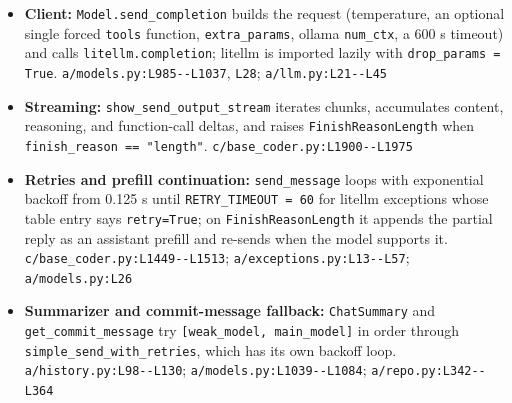 \begin{itemize}
\item \textbf{Client:} \texttt{Model.\allowbreak{}send\_\allowbreak{}completion} builds the request (temperature, an optional single forced \texttt{tools} function, \texttt{extra\_\allowbreak{}params}, ollama \texttt{num\_\allowbreak{}ctx}, a 600 s timeout) and calls \texttt{litellm.\allowbreak{}completion}; litellm is imported lazily with \texttt{drop\_\allowbreak{}params = True}. \texttt{a/\allowbreak{}models.\allowbreak{}py:\allowbreak{}L985-\allowbreak{}-\allowbreak{}L1037}, \texttt{L28}; \texttt{a/\allowbreak{}llm.\allowbreak{}py:\allowbreak{}L21-\allowbreak{}-\allowbreak{}L45}
\item \textbf{Streaming:} \texttt{show\_\allowbreak{}send\_\allowbreak{}output\_\allowbreak{}stream} iterates chunks, accumulates content, reasoning, and function-call deltas, and raises \texttt{FinishReasonLength} when \texttt{finish\_\allowbreak{}reason == "length"}. \texttt{c/\allowbreak{}base\_\allowbreak{}coder.\allowbreak{}py:\allowbreak{}L1900-\allowbreak{}-\allowbreak{}L1975}
\item \textbf{Retries and prefill continuation:} \texttt{send\_\allowbreak{}message} loops with exponential backoff from 0.125 s until \texttt{RETRY\_\allowbreak{}TIMEOUT = 60} for litellm exceptions whose table entry says \texttt{retry=True}; on \texttt{FinishReasonLength} it appends the partial reply as an assistant prefill and re-sends when the model supports it. \texttt{c/\allowbreak{}base\_\allowbreak{}coder.\allowbreak{}py:\allowbreak{}L1449-\allowbreak{}-\allowbreak{}L1513}; \texttt{a/\allowbreak{}exceptions.\allowbreak{}py:\allowbreak{}L13-\allowbreak{}-\allowbreak{}L57}; \texttt{a/\allowbreak{}models.\allowbreak{}py:\allowbreak{}L26}
\item \textbf{Summarizer and commit-message fallback:} \texttt{ChatSummary} and \texttt{get\_\allowbreak{}commit\_\allowbreak{}message} try \texttt{[weak\_\allowbreak{}model, main\_\allowbreak{}model]} in order through \texttt{simple\_\allowbreak{}send\_\allowbreak{}with\_\allowbreak{}retries}, which has its own backoff loop. \texttt{a/\allowbreak{}history.\allowbreak{}py:\allowbreak{}L98-\allowbreak{}-\allowbreak{}L130}; \texttt{a/\allowbreak{}models.\allowbreak{}py:\allowbreak{}L1039-\allowbreak{}-\allowbreak{}L1084}; \texttt{a/\allowbreak{}repo.\allowbreak{}py:\allowbreak{}L342-\allowbreak{}-\allowbreak{}L364}
\end{itemize}

